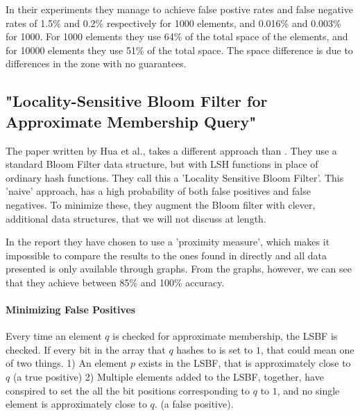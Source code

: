 \documentclass[a4paper,11pt]{article}
\begin{document}
In their experiments they manage to achieve false postive rates and false negative rates of 1.5\% and 0.2\% respectively for 1000 elements, and 0.016\% and 0.003\% for 1000. For 1000 elements they use 64\% of the total space of the elements, and for 10000 elements they use 51\% of the total space. The space difference is due to differences in the zone with no guarantees. %


\subsection{"Locality-Sensitive Bloom Filter for Approximate Membership Query"}
The paper written by Hua et al.\cite{paper:hua}, takes a different approach than \cite{paper:harvard}. They use a standard Bloom Filter data structure, but with LSH functions in place of ordinary hash functions. They call this a 'Locality Sensitive Bloom Filter'. This 'naive' approach, has a high probability of both false positives and false negatives. To minimize these, they augment the Bloom filter with clever, additional data structures, that we will not discuss at length.

In the report they have chosen to use a 'proximity measure', which makes it impossible to compare the results to the ones found in \cite{paper:harvard} directly and all data presented is only available through graphs. From the graphs, however, we can see that they achieve between 85\% and 100\% accuracy.

\paragraph{Minimizing False Positives}
Every time an element $q$ is checked for approximate membership, the LSBF is checked. If every bit in the array that $q$ hashes to is set to $1$, that could mean one of two things.
1) An element $p$ exists in the LSBF, that is approximately close to $q$ (a true positive)
2) Multiple elements added to the LSBF, together, have conspired to set the all the bit positions corresponding to $q$ to $1$, and no single element is approximately close to $q$. (a false positive).
\end{document}
